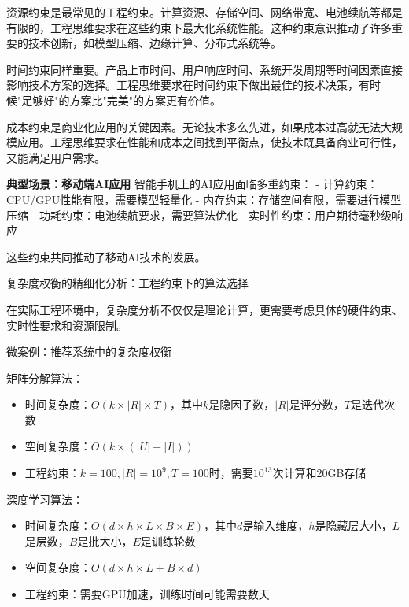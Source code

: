 资源约束是最常见的工程约束。计算资源、存储空间、网络带宽、电池续航等都是有限的，工程思维要求在这些约束下最大化系统性能。这种约束意识推动了许多重要的技术创新，如模型压缩、边缘计算、分布式系统等。

时间约束同样重要。产品上市时间、用户响应时间、系统开发周期等时间因素直接影响技术方案的选择。工程思维要求在时间约束下做出最佳的技术决策，有时候"足够好"的方案比"完美"的方案更有价值。

成本约束是商业化应用的关键因素。无论技术多么先进，如果成本过高就无法大规模应用。工程思维要求在性能和成本之间找到平衡点，使技术既具备商业可行性，又能满足用户需求。

\textbf{典型场景：移动端AI应用}
智能手机上的AI应用面临多重约束：
- 计算约束：CPU/GPU性能有限，需要模型轻量化
- 内存约束：存储空间有限，需要进行模型压缩
- 功耗约束：电池续航要求，需要算法优化
- 实时性约束：用户期待毫秒级响应

这些约束共同推动了移动AI技术的发展。

 
复杂度权衡的精细化分析：工程约束下的算法选择

在实际工程环境中，复杂度分析不仅仅是理论计算，更需要考虑具体的硬件约束、实时性要求和资源限制。

微案例：推荐系统中的复杂度权衡

矩阵分解算法：
\begin{itemize}
\item 时间复杂度：$O(k \times |R| \times T)$，其中$k$是隐因子数，$|R|$是评分数，$T$是迭代次数
\item 空间复杂度：$O(k \times (|U| + |I|))$
\item 工程约束：$k=100, |R|=10^9, T=100$时，需要$10^{13}$次计算和20GB存储
\end{itemize}

深度学习算法：
\begin{itemize}
\item 时间复杂度：$O(d \times h \times L \times B \times E)$，其中$d$是输入维度，$h$是隐藏层大小，$L$是层数，$B$是批大小，$E$是训练轮数
\item 空间复杂度：$O(d \times h \times L + B \times d)$
\item 工程约束：需要GPU加速，训练时间可能需要数天
\end{itemize}

